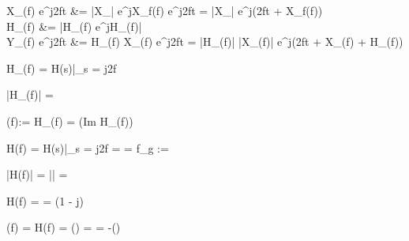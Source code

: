 \begin{abox}
	X_(f) \cdot e^{j2\pi ft} &= \left|X_\right| \cdot e^{j\sphericalangle X_f(f)} \cdot e^{j2\pi ft} = \left|X_\right| \cdot e^{j(2\pi ft + \sphericalangle X_f(f))}\\
	H_(f) &= \left|H_(f) \cdot e^{j\sphericalangle H_(f)}\right|\\
	Y_(f) \cdot e^{j2\pi ft} &= H_(f) \cdot X_(f) \cdot e^{j2\pi ft} = \left|H_(f)\right| \cdot \left|X_(f)\right| \cdot e^{j(2\pi ft + \sphericalangle X_(f) + \sphericalangle H_(f))}
\end{abox}

\begin{abox}
	H_(f) = H(s)|_{s = j2\pi f}
\end{abox}

\begin{abox}
	\left|H_(f)\right| = 
\end{abox}

\begin{abox}
	\phi(f):= \sphericalangle H_(f) = (Im H_(f)) \cdot \arccos{}
\end{abox}

\begin{abox}
	H(f) = H(s)|_{s = j2\pi f} =  =   f_g := 
\end{abox}

\begin{abox}
	\left|H(f)\right| = \left|\right| = 
\end{abox}

\begin{abox}
	H(f) =  =  \cdot \left(1 - j\right)
\end{abox}

\begin{abox}
	\phi(f) = \sphericalangle H(f) = \arctan() = \arctan {} = -\arctan()
\end{abox}

